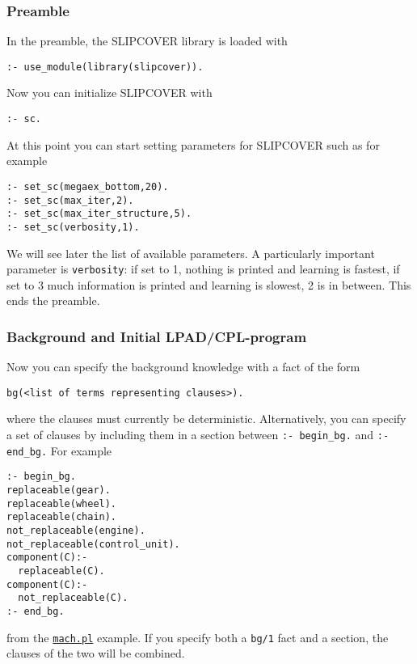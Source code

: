 \subsubsection{Preamble}
In the preamble, the SLIPCOVER library is loaded with
\begin{verbatim}
:- use_module(library(slipcover)).
\end{verbatim}
Now you can initialize SLIPCOVER with
\begin{verbatim}
:- sc.
\end{verbatim}
At this point you can start setting parameters for SLIPCOVER such as for example
\begin{verbatim}
:- set_sc(megaex_bottom,20).
:- set_sc(max_iter,2).
:- set_sc(max_iter_structure,5).
:- set_sc(verbosity,1).
\end{verbatim}
We will see later the list of available parameters.
A particularly important parameter is \verb|verbosity|: if set
to 1, nothing is printed and learning is  fastest, if set to 3 much information is printed and learning is slowest, 2 is in between.
This ends the preamble.

\subsubsection{Background and Initial LPAD/CPL-program}
%
Now you can specify the background knowledge with a 
fact of the form 
\begin{verbatim}
bg(<list of terms representing clauses>).
\end{verbatim}
where the clauses must currently be deterministic.
Alternatively, you can specify a set of clauses by including them in 
a section between
\verb|:- begin_bg.| and \verb|:- end_bg.| For example
\begin{verbatim}
:- begin_bg.
replaceable(gear).
replaceable(wheel).
replaceable(chain).
not_replaceable(engine).
not_replaceable(control_unit).
component(C):-
  replaceable(C).
component(C):-
  not_replaceable(C).
:- end_bg.
\end{verbatim}
from the \href{http://cplint.lamping.unife.it/example/learning/mach.pl}{\texttt{mach.pl}} example.
If you specify both a \verb|bg/1| fact and a section, the clauses of the two will be combined.


